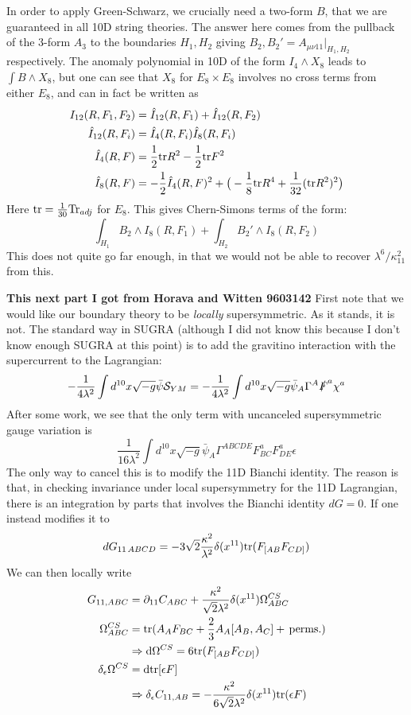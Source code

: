 \documentclass[11pt, class=article, crop=false]{standalone}
\begin{document}
\begin{enumerate}
	 In order to apply Green-Schwarz, we crucially need a two-form $B$, that we are guaranteed in all 10D string theories. The answer here comes from the pullback of the 3-form $A_3$ to the boundaries $H_1, H_2$ giving $B_2, B_2' = A_{\mu \nu 11}\big|_{H_1, H_2}$ respectively. 	The anomaly polynomial in 10D of the form $I_4 \wedge X_8$ leads to $\int B \wedge X_8$, but one can see that $X_8$ for $E_8 \times E_8$ involves no cross terms from either $E_8$, and can in fact be written as 
	 \begin{align}
	 	I_{12}(R, F_1, F_2)&= \hat I_{12}(R, F_1) + \hat I_{12}(R, F_2)\\
		\hat I_{12}(R, F_i) &= \hat I_4(R, F_i) \hat I_8(R, F_i)\\
		\hat I_4(R, F) &= \frac12 \mathrm{tr} R^2 - \frac12 \mathrm{tr} F^2\\
		\hat I_8(R, F) &= - \frac12 \hat I_4 (R, F)^2 + \big(-\frac18 \mathrm{tr} R^4 + \frac{1}{32} (\mathrm{tr} R^2)^2 \big) \label{eq:I8}
	 \end{align}
	 Here $\mathrm{tr} = \frac{1}{30} \mathrm{Tr}_{adj}$ for $E_8$.
	 This gives Chern-Simons terms of the form:
	 \[
	 	\int_{H_1} B_2 \wedge I_8(R, F_1) + \int_{H_2} B_2' \wedge I_8(R, F_2)
	 \]
	 This does not quite go far enough, in that we would not be able to recover $\lambda^6/\kappa_{11}^2$ from this. 
	 
	\textbf{This next part I got from Horava and Witten 9603142}
	 First note that we would like our boundary theory to be \emph{locally} supersymmetric. As it stands, it is not. The standard way in SUGRA (although I did not know this because I don't know enough SUGRA at this point) is to add the gravitino interaction with the supercurrent to the Lagrangian: 
	 \[
		-\frac{1}{4 \lambda^2} \int d^{10} x \sqrt{-g} \bar \psi \mathcal S_{YM} = -\frac{1}{4 \lambda^2} \int d^{10} x \sqrt{-g} \bar \psi_A \Gamma^A \slashed{F}^a \chi^a
	 \]
	 After some work, we see that the only term with uncanceled supersymmetric gauge variation is
	 \[
	 	\frac{1}{16 \lambda^2} \int d^{10} x\sqrt{-g} \bar \psi_A  \Gamma^{ABCDE} F_{BC}^a F_{DE}^a \epsilon
	 \]
	 The only way to cancel this is to modify the 11D Bianchi identity. The reason is that, in checking invariance under local supersymmetry for the 11D Lagrangian, there is an integration by parts that involves the Bianchi identity $dG = 0$. If one instead modifies it to
	 \[
	 	dG_{11 \, A B C D} = - 3 \sqrt2 \frac{\kappa^2}{\lambda^2} \delta(x^{11}) \mathrm{tr} (F_{[AB} F_{CD]})
	 \]
	 We can then locally write 
	 \begin{align}
	 	G_{11, ABC} &= \partial_{11} C_{ABC} + \frac{\kappa^2}{\sqrt2 \lambda^2} \delta(x^{11}) \Omega_{ABC}^{CS} \label{eq:anom1}\\
		 \Omega_{ABC}^{CS} &= \mathrm{tr}(A_A F_{BC} + \frac23 A_A [A_B, A_C] + \,\mathrm{perms.}) \label{eq:anom2} \\
		 &\Rightarrow \mathrm{d} \Omega^{CS} = 6 \mathrm{tr} (F_{[AB} F_{CD]}) \label{eq:anom3}\\
		 \delta_{\epsilon} \Omega^{CS} &= \mathrm{d} \mathrm{tr} [\epsilon F] \label{eq:anom4}\\
		&\Rightarrow \delta_{\epsilon} C_{11, AB} = - \frac{\kappa^2}{6\sqrt2 \lambda^2} \delta(x^{11}) \mathrm{tr} (\epsilon F) \label{eq:anom5}
	 \end{align}
	 

\end{enumerate}
\end{document}
